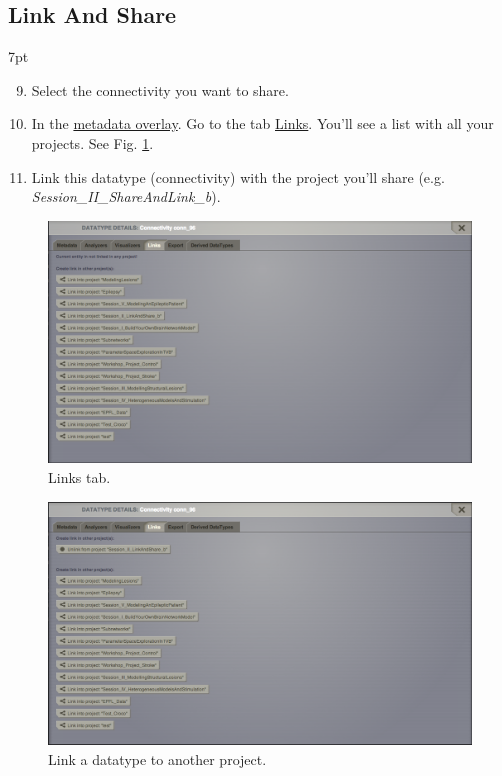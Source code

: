 \documentclass{tufte-handout}
\newenvironment{formal}{%
  \def\FrameCommand{%
    \hspace{1pt}%
    {\color{DarkBlue}\vrule width 2pt}%
    {\color{formalshade}\vrule width 4pt}%
    \colorbox{formalshade}%
  }%
  \MakeFramed{\advance\hsize-\width\FrameRestore}%
  \noindent\hspace{-4.55pt}%
  \begin{adjustwidth}{}{7pt}%
  \vspace{2pt}\vspace{2pt}%
}
{%
  \vspace{2pt}\end{adjustwidth}\endMakeFramed%
}
\begin{document}
\subsection{Link And Share}\label{sec:link_and_share}
\begin{formal}
\begin{enumerate}[resume]
\setcounter{enumi}{8}
\item Select the connectivity you want to share.
\item In the \underline{metadata overlay}. Go to the tab \underline{Links}. You'll see a list with all your projects. See Fig. \ref{fig:linkstab}.
\item Link this datatype (connectivity) with the project you'll share (e.g. \textit{Session\_II\_ShareAndLink\_b}).
\end{enumerate}
\end{formal} 

\begin{figure}[h]
  \includegraphics[width=\linewidth]{Handout_UI_LinkAndShare_LinksTab}%
  \caption{Links tab.}%
  \label{fig:linkstab}%
\end{figure}

\begin{figure}[h]
  \includegraphics[width=\linewidth]{Handout_UI_LinkAndShare_LinkedProject}%
  \caption{Link a datatype to another project.}%
  \label{fig:linkproject}%
\end{figure}
\end{document}
